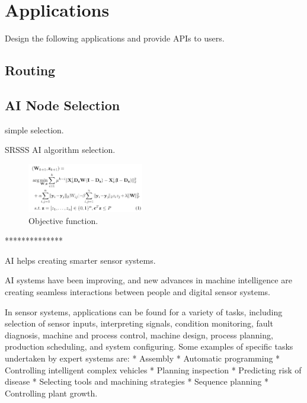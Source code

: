 \section{Applications}

Design the following applications and provide APIs to users.

\subsection{Routing}

\subsection{AI Node Selection}

simple selection.

SRSSS AI algorithm selection.

\begin{figure}[htbp]
	\centering
	\includegraphics[width=2in]{Figure/OF}
	\caption{Objective function.}
	\label{system}
\end{figure}


**************

AI helps creating smarter sensor systems.

AI systems have been improving, and new advances in machine intelligence are creating seamless interactions between people and digital sensor systems.

 In sensor systems, applications can be found for a variety of tasks, including selection of sensor inputs, interpreting signals, condition monitoring, fault diagnosis, machine and process control, machine design, process planning, production scheduling, and system configuring. Some examples of specific tasks undertaken by expert systems are:
* Assembly 
* Automatic programming 
* Controlling intelligent complex vehicles  
* Planning inspection 
* Predicting risk of disease 
* Selecting tools and machining strategies 
* Sequence planning 
* Controlling plant growth. 

